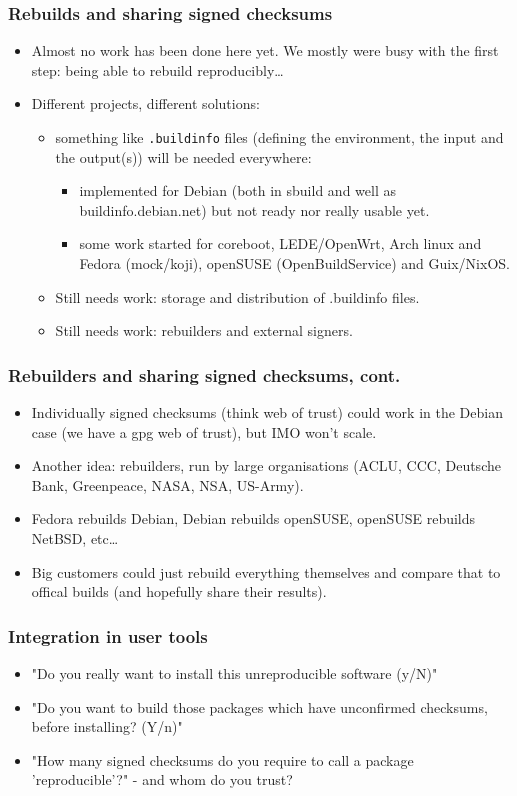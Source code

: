 \documentclass[14pt,aspectratio=169]{beamer}
\begin{document}
\begin{frame}
 \frametitle{Rebuilds and sharing signed checksums}
 \begin{itemize}
  \item Almost no work has been done here yet. We mostly were busy with the first step:
  being able to rebuild reproducibly…
  \item Different projects, different solutions:
 \begin{itemize}
  \item<2-3> something like \texttt{.buildinfo} files (defining the environment,
  the input and the output(s)) will be needed everywhere:
 \begin{itemize}
  \item<2-3> implemented for Debian (both in sbuild and well as
  buildinfo.debian.net) but not ready nor really usable yet.
  \item<2-3> some work started for coreboot, LEDE/OpenWrt, Arch linux and Fedora (mock/koji), openSUSE (OpenBuildService) and Guix/NixOS.
 \end{itemize}
 \item<3> Still needs work: storage and distribution of .buildinfo files.
 \item<3> Still needs work: rebuilders and external signers.
 \end{itemize}
 \end{itemize}
\end{frame}

\begin{frame}
 \frametitle{Rebuilders and sharing signed checksums, cont.}
 \begin{itemize}
  \item Individually signed checksums (think web of trust) could work in the
  Debian case (we have a gpg web of trust), but IMO won't scale.
  \item { Another idea: rebuilders, run by large organisations
  (ACLU, CCC, Deutsche Bank, Greenpeace, NASA, NSA, US-Army).}
  \item Fedora rebuilds Debian, Debian rebuilds openSUSE, openSUSE rebuilds
  NetBSD, etc…
  \item Big customers could just rebuild everything themselves and compare that to offical builds (and hopefully share their results).
 \end{itemize}
\end{frame}


\begin{frame}
 \frametitle{Integration in user tools}
 \begin{itemize}
  \item "Do you really want to install this unreproducible software (y/N)"
  \item<2-3> "Do you want to build those packages which have unconfirmed checksums,
  before installing? (Y/n)"
  \item<3>{ "How many signed checksums do you require to call a package
  'reproducible'?" - and whom do you trust?}
 \end{itemize}
\end{frame}
\end{document}
